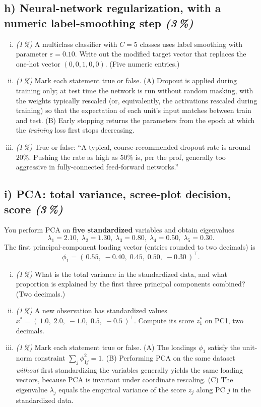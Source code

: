 \documentclass[11pt,a4paper]{article}
\newcommand{\subpoints}[1]{\textit{(#1\,\%)}}
\begin{document}
\subsection*{h) Neural-network regularization, with a numeric label-smoothing step \subpoints{3}}
\begin{enumerate}[(i)]
  \item \subpoints{1} A multiclass classifier with $C = 5$ classes uses label smoothing with parameter $\varepsilon = 0.10$. Write out the modified target vector that replaces the one-hot vector $(0, 0, 1, 0, 0)$. (Five numeric entries.)
  \item \subpoints{1} Mark each statement true or false. (A) Dropout is applied during training only; at test time the network is run without random masking, with the weights typically rescaled (or, equivalently, the activations rescaled during training) so that the expectation of each unit's input matches between train and test. (B) Early stopping returns the parameters from the epoch at which the \emph{training} loss first stops decreasing.
  \item \subpoints{1} True or false: ``A typical, course-recommended dropout rate is around $20\%$. Pushing the rate as high as $50\%$ is, per the prof, generally too aggressive in fully-connected feed-forward networks.''
\end{enumerate}

\subsection*{i) PCA: total variance, scree-plot decision, score \subpoints{3}}
You perform PCA on \textbf{five standardized} variables and obtain eigenvalues
$$\lambda_1 = 2.10,\; \lambda_2 = 1.30,\; \lambda_3 = 0.80,\; \lambda_4 = 0.50,\; \lambda_5 = 0.30.$$
The first principal-component loading vector (entries rounded to two decimals) is
$$\phi_1 = (\,0.55,\; -0.40,\; 0.45,\; 0.50,\; -0.30\,)^\top.$$

\begin{enumerate}[(i)]
  \item \subpoints{1} What is the total variance in the standardized data, and what proportion is explained by the first three principal components combined? (Two decimals.)
  \item \subpoints{1} A new observation has standardized values $x^* = (\,1.0,\; 2.0,\; -1.0,\; 0.5,\; -0.5\,)^\top$. Compute its score $z^*_1$ on PC1, two decimals.
  \item \subpoints{1} Mark each statement true or false. (A) The loadings $\phi_1$ satisfy the unit-norm constraint $\sum_j \phi_{1j}^2 = 1$. (B) Performing PCA on the same dataset \emph{without} first standardizing the variables generally yields the same loading vectors, because PCA is invariant under coordinate rescaling. (C) The eigenvalue $\lambda_j$ equals the empirical variance of the score $z_j$ along PC $j$ in the standardized data.
\end{enumerate}
\end{document}
